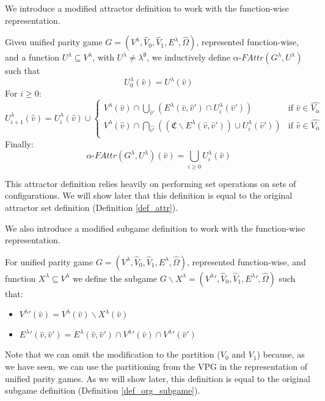 We introduce a modified attractor definition to work with the function-wise representation.
\begin{definition}
		\label{def_Uattr}Given unified parity game $G = (V^\lambda, \hat{V}_0,\hat{V}_1,E^\lambda,\hat{\Omega})$, represented function-wise, and a function $U^\lambda \subseteq V^\lambda$, with $U^\lambda \neq \lambda^\emptyset$, we inductively define $\alpha\textit{-FAttr}(G^\lambda,U^\lambda)$ such that
	\[U^\lambda_0(\hat{v}) = U^\lambda(\hat{v}) \]
	For $i \geq 0$:
	\[
	U^\lambda_{i+1}(\hat{v}) = U^\lambda_i(\hat{v}) \cup \begin{cases}
V^\lambda(\hat{v}) \cap \bigcup_{\hat{v}'} (E^\lambda(\hat{v},\hat{v}') \cap U^\lambda_i(\hat{v}')) & \text{if } \hat{v} \in \hat{V_{\alpha}}\\
V^\lambda(\hat{v}) \cap \bigcap_{\hat{v'}}((\mathfrak{C} \backslash E^\lambda(\hat{v},\hat{v}')) \cup U^\lambda_i(\hat{v}')) & \text{if }\hat{v} \in  \hat{V_{\overline{\alpha}}} \\
	\end{cases}
	\]
	Finally:
	\[\alpha\textit{-FAttr}(G^\lambda,U^\lambda)(\hat{v}) = \bigcup_{i \geq 0} U^\lambda_i(\hat{v}) \]
\end{definition}
This attractor definition relies heavily on performing set operations on sets of configurations. We will show later that this definition is equal to the original attractor set definition (Definition \ref{def_attr}). 

We also introduce a modified subgame definition to work with the function-wise representation.
\begin{definition}
	\label{def_Usubgame}
	For unified parity game $G = (V^\lambda,\hat{V}_0,\hat{V}_1,E^\lambda,\hat{\Omega})$, represented function-wise, and function $X^\lambda \subseteq V^\lambda$ we define the subgame $G \backslash X^\lambda = ({V^\lambda}',\hat{V}_0,\hat{V}_1,{E^\lambda}',\hat{\Omega})$ such that:
	\begin{itemize}
		\item ${V^\lambda}'(\hat{v}) = V^\lambda(\hat{v}) \backslash X^\lambda(\hat{v})$
		\item ${E^\lambda}'(\hat{v},\hat{v}') = E^\lambda(\hat{v},\hat{v}') \cap {V^\lambda}'(\hat{v}) \cap {V^\lambda}'(\hat{v}')$
	\end{itemize}
\end{definition}
Note that we can omit the modification to the partition ($V_0$ and $V_1$) because, as we have seen, we can use the partitioning from the VPG in the representation of unified parity games. As we will show later, this definition is equal to the original subgame definition (Definition \ref{def_org_subgame}).


